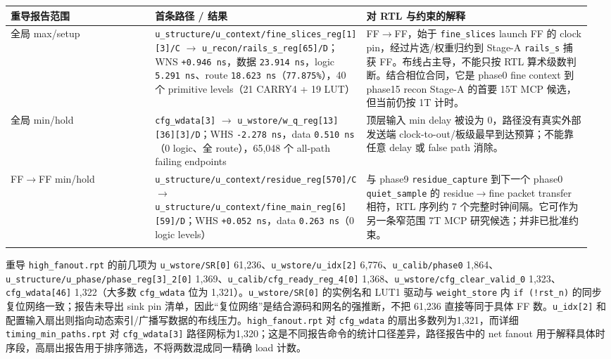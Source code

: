 \documentclass[UTF8,fontset=fandol,10pt,a4paper,openany]{ctexrep}
\newcommand{\code}[1]{\nolinkurl{#1}}
\begin{document}
\begingroup\small\setlength{\tabcolsep}{2pt}\renewcommand{\arraystretch}{1.25}\begin{longtable}{@{}>{\raggedright\arraybackslash}p{0.25\linewidth}>{\raggedright\arraybackslash}p{0.32\linewidth}>{\raggedright\arraybackslash}p{0.39\linewidth}@{}}
\toprule
\textbf{重导报告范围} & \textbf{首条路径 / 结果} & \textbf{对 RTL 与约束的解释}\\\midrule\endhead
全局 max/setup & \code{u_structure/u_context/fine_slices_reg[1][3]/C} \ensuremath{\rightarrow} \code{u_recon/rails_s_reg[65]/D}；WNS \code{+0.946 ns}，数据 \code{23.914 ns}，logic \code{5.291 ns}、route \code{18.623 ns}（\code{77.875\%}），40 个 primitive levels（21 CARRY4 + 19 LUT） & FF\ensuremath{\rightarrow}FF，始于 \code{fine_slices} launch FF 的 clock pin，经过片选/权重归约到 Stage-A \code{rails_s} 捕获 FF。布线占主导，不能只按 RTL 算术级数判断。结合相位合同，它是 phase0 fine context 到 phase15 recon Stage-A 的首要 15T MCP 候选，但当前仍按 1T 计时。\\\addlinespace[2pt]
全局 min/hold & \code{cfg_wdata[3]} \ensuremath{\rightarrow} \code{u_wstore/w_q_reg[13][36][3]/D}；WHS \code{-2.278 ns}，data \code{0.510 ns}（0 logic、全 route），65,048 个 all-path failing endpoints & 顶层输入 min delay 被设为 0，路径没有真实外部发送端 clock-to-out/板级最早到达预算；不能靠任意 delay 或 false path 消除。\\\addlinespace[2pt]
FF\ensuremath{\rightarrow}FF min/hold & \code{u_structure/u_context/residue_reg[570]/C} \ensuremath{\rightarrow} \code{u_structure/u_context/fine_main_reg[6][59]/D}；WHS \code{+0.052 ns}，data \code{0.263 ns}（0 logic levels） & 与 phase9 \code{residue_capture} 到下一个 phase0 \code{quiet_sample} 的 residue\ensuremath{\rightarrow}fine packet transfer 相符，RTL 序列约 7 个完整时钟间隔。它可作为另一条窄范围 7T MCP 研究候选；并非已批准约束。\\\addlinespace[2pt]
\bottomrule\end{longtable}\endgroup


重导 \code{high_fanout.rpt} 的前几项为 \code{u_wstore/SR[0]} 61,236、\code{u_wstore/u_idx[2]} 6,776、\code{u_calib/phase0} 1,864、\code{u_structure/u_phase/phase_reg[3]_2[0]} 1,369、\code{u_calib/cfg_ready_reg_4[0]} 1,368、\code{u_wstore/cfg_clear_valid_0} 1,323、\code{cfg_wdata[46]} 1,322（大多数 \code{cfg_wdata} 位为 1,321）。\code{u_wstore/SR[0]} 的实例名和 LUT1 驱动与 \code{weight_store} 内 \code{if (!rst_n)} 的同步复位网络一致；报告未导出 sink pin 清单，因此“复位网络”是结合源码和网名的强推断，不把 61,236 直接等同于具体 FF 数。\code{u_idx[2]} 和配置输入扇出则指向动态索引/广播写数据的布线压力。\code{high_fanout.rpt} 对 \code{cfg_wdata} 的扇出多数列为1,321，而详细 \code{timing_min_paths.rpt} 对 \code{cfg_wdata[3]} 路径网标为1,320；这是不同报告命令的统计口径差异，路径报告中的 net fanout 用于解释具体时序段，高扇出报告用于排序筛选，不将两数混成同一精确 load 计数。
\end{document}
